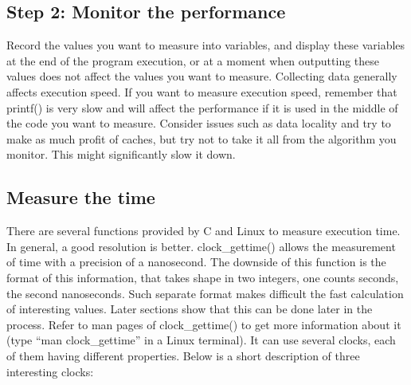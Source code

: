 \subsection{Step 2: Monitor the performance}
\label{sec:instrument}
Record the values you want to measure into variables, and display these variables at the end of the program execution, or at a moment when outputting these values does not affect the values you want to measure. Collecting data generally affects execution speed. If you want to measure execution speed, remember that printf() is very slow and will affect the performance if it is used in the middle of the code you want to measure. Consider issues such as data locality and try to make as much profit of caches, but try not to take it all from the algorithm you monitor. This might significantly slow it down.

\subsection{Measure the time}
There are several functions provided by {C} and Linux to measure execution time. In general, a good resolution is better. clock\_gettime() allows the measurement of time with a precision of a nanosecond. The downside of this function is the format of this information, that takes shape in two integers, one counts seconds, the second nanoseconds. Such separate format makes difficult the fast calculation of interesting values. Later sections show that this can be done later in the process. Refer to man pages of clock\_gettime() to get more information about it (type ``man clock\_gettime'' in a Linux terminal). It can use several clocks, each of them having different properties. Below is a short description of three interesting clocks:

